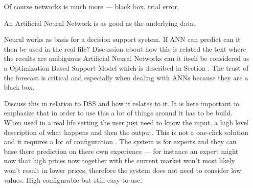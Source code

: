 



Of course networks is much more --- black box. trial error.



An Artificial Neural Network is as good as the underlying data. 



Neural works as basis for a decision support system. If ANN can predict can it then be used in the real life? Discussion about how this is related the text where the results are ambiguous 
Artificial Neural Networks can it itself be considered as a Optimization Based Support Model which is described in Section . The trust of the forecast is critical and especially when dealing with ANNs because they are a black box. 

Discuss this in relation to DSS and how it relates to it. It is here important to emphasize that in order to use this a lot of things around it has to be build. When used in a real life setting the user just need to know the input, a high level description of what happens and then the output.
This is not a one-click solution and it requires a lot of configuration . The system is for experts and they can base there prediction on there own experience --- for instance an expert might now that high prices now together with the current market won't most likely won't result in lower prices, therefore the system does not need to consider low values. High configurable but still easy-to-use.

